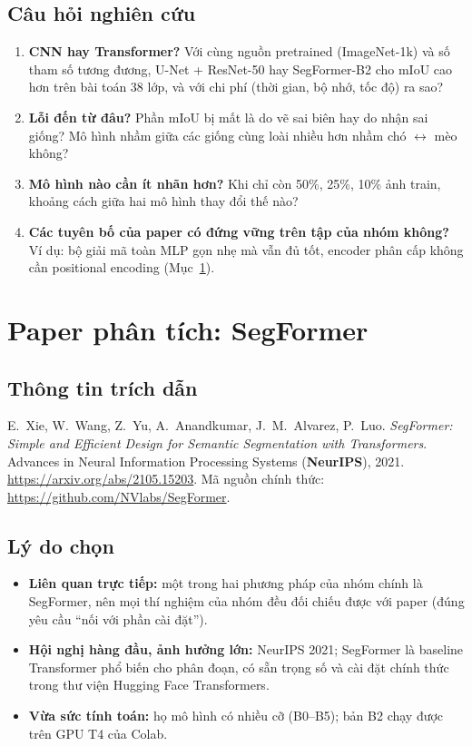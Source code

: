 \documentclass[12pt]{article}
\newcommand{\st}[1]{\textbf{#1}}
\begin{document}
\subsection{Câu hỏi nghiên cứu}
\begin{enumerate}
  \item \st{CNN hay Transformer?} Với cùng nguồn pretrained (ImageNet-1k) và số tham số tương đương, U-Net + ResNet-50 hay
        SegFormer-B2 cho mIoU cao hơn trên bài toán 38 lớp, và với chi phí (thời gian, bộ nhớ, tốc độ) ra sao?
  \item \st{Lỗi đến từ đâu?} Phần mIoU bị mất là do vẽ sai biên hay do nhận sai giống? Mô hình nhầm giữa các giống cùng
        loài nhiều hơn nhầm chó $\leftrightarrow$ mèo không?
  \item \st{Mô hình nào cần ít nhãn hơn?} Khi chỉ còn 50\%, 25\%, 10\% ảnh train, khoảng cách giữa hai mô hình thay đổi thế nào?
  \item \st{Các tuyên bố của paper có đứng vững trên tập của nhóm không?} Ví dụ: bộ giải mã toàn MLP gọn nhẹ mà vẫn đủ tốt,
        encoder phân cấp không cần positional encoding (Mục~\ref{sec:paper}).
\end{enumerate}

\section{Paper phân tích: SegFormer}\label{sec:paper}
\subsection{Thông tin trích dẫn}
E.~Xie, W.~Wang, Z.~Yu, A.~Anandkumar, J.~M.~Alvarez, P.~Luo. \emph{SegFormer: Simple and Efficient Design for Semantic
Segmentation with Transformers}. Advances in Neural Information Processing Systems (\st{NeurIPS}), 2021.
\url{https://arxiv.org/abs/2105.15203}. Mã nguồn chính thức: \url{https://github.com/NVlabs/SegFormer}.

\subsection{Lý do chọn}
\begin{itemize}
  \item \st{Liên quan trực tiếp:} một trong hai phương pháp của nhóm chính là SegFormer, nên mọi thí nghiệm của nhóm đều đối
        chiếu được với paper (đúng yêu cầu ``nối với phần cài đặt'').
  \item \st{Hội nghị hàng đầu, ảnh hưởng lớn:} NeurIPS 2021; SegFormer là baseline Transformer phổ biến cho phân đoạn, có sẵn
        trọng số và cài đặt chính thức trong thư viện Hugging Face Transformers.
  \item \st{Vừa sức tính toán:} họ mô hình có nhiều cỡ (B0--B5); bản B2 chạy được trên GPU T4 của Colab.
\end{itemize}
\end{document}
